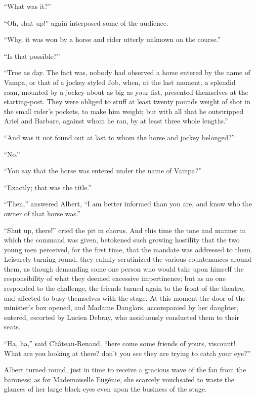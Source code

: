“What was it?”

“Oh, shut up!” again interposed some of the audience.

“Why, it was won by a horse and rider utterly unknown on the course.”

“Is that possible?”

“True as day. The fact was, nobody had observed a horse entered by the
name of Vampa, or that of a jockey styled Job, when, at the last
moment, a splendid roan, mounted by a jockey about as big as your fist,
presented themselves at the starting-post. They were obliged to stuff
at least twenty pounds weight of shot in the small rider’s pockets, to
make him weight; but with all that he outstripped Ariel and Barbare,
against whom he ran, by at least three whole lengths.”

“And was it not found out at last to whom the horse and jockey
belonged?”

“No.”

“You say that the horse was entered under the name of Vampa?”

“Exactly; that was the title.”

“Then,” answered Albert, “I am better informed than you are, and know
who the owner of that horse was.”

“Shut up, there!” cried the pit in chorus. And this time the tone and
manner in which the command was given, betokened such growing hostility
that the two young men perceived, for the first time, that the mandate
was addressed to them. Leisurely turning round, they calmly scrutinized
the various countenances around them, as though demanding some one
person who would take upon himself the responsibility of what they
deemed excessive impertinence; but as no one responded to the
challenge, the friends turned again to the front of the theatre, and
affected to busy themselves with the stage. At this moment the door of
the minister’s box opened, and Madame Danglars, accompanied by her
daughter, entered, escorted by Lucien Debray, who assiduously conducted
them to their seats.

“Ha, ha,” said Château-Renaud, “here come some friends of yours,
viscount! What are you looking at there? don’t you see they are trying
to catch your eye?”

Albert turned round, just in time to receive a gracious wave of the fan
from the baroness; as for Mademoiselle Eugénie, she scarcely vouchsafed
to waste the glances of her large black eyes even upon the business of
the stage.

